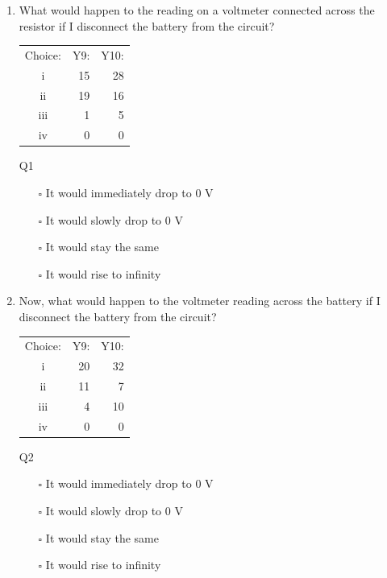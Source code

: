 \documentclass[a4paper,openany,nobib]{tufte-book}
\begin{document}
\begin{enumerate}
    \item What would happen to the reading on a voltmeter connected across the resistor if I disconnect the battery from the circuit?

		\begin{margintable}[1cm]
  \begin{center}
    \begin{tabular}{crr}
      \toprule
      Choice: & Y9: & Y10:\\
      i & 15 & 28\\
      ii & 19 & 16\\
      iii & 1 & 5\\
      iv & 0 & 0\\
      \bottomrule
    \end{tabular}
	\caption{\centering Q1}
  \end{center}
\end{margintable}

		\begin{itemize}
\item[$\square$]It would immediately drop to $0$ V
	\item[$\square$]It would slowly drop to $0$ V
	\item[$\square$]It would stay the same
		\item[$\square$]It would rise to infinity
\end{itemize}
\item Now, what would happen to the voltmeter reading across the battery if I disconnect the battery from the circuit?
	\begin{margintable}
	\begin{center}
	\begin{tabular}{crr}
	\toprule
	 Choice: & Y9: & Y10:\\
	 i & 20 & 32\\
	 ii & 11 & 7\\
	 iii & 4 & 10\\
	 iv & 0 & 0\\
	 \bottomrule
	\end{tabular}
	\caption{\centering Q2}
	\end{center}
	\end{margintable}
	\begin{itemize}
\item[$\square$]It would immediately drop to $0$ V
	\item[$\square$]It would slowly drop to $0$ V
	\item[$\square$]It would stay the same
		\item[$\square$]It would rise to infinity
	\end{itemize}
\end{enumerate}
\end{document}
